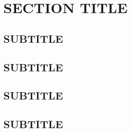 \documentclass[12pt]{article}
\begin{document}
	
	\section{SECTION TITLE}
	
	
	\subsection{SUBTITLE}
	
	
	\subsection{SUBTITLE}
	
	
	\subsection{SUBTITLE}

	
	\subsection{SUBTITLE}

	
	\newpage    

\printbibliography %
\end{document}
